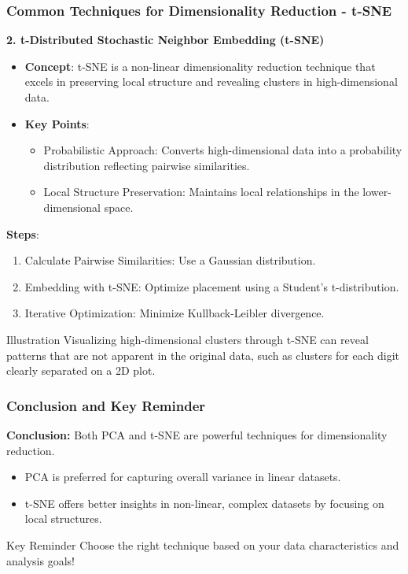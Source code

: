 \documentclass[aspectratio=169]{beamer}
\begin{document}
\begin{frame}[fragile]
    \frametitle{Common Techniques for Dimensionality Reduction - t-SNE}
    \textbf{2. t-Distributed Stochastic Neighbor Embedding (t-SNE)}
    
    \begin{itemize}
        \item \textbf{Concept}: t-SNE is a non-linear dimensionality reduction technique that excels in preserving local structure and revealing clusters in high-dimensional data.
        \item \textbf{Key Points}:
        \begin{itemize}
            \item Probabilistic Approach: Converts high-dimensional data into a probability distribution reflecting pairwise similarities.
            \item Local Structure Preservation: Maintains local relationships in the lower-dimensional space.
        \end{itemize}
    \end{itemize}
    
    \textbf{Steps}:
    \begin{enumerate}
        \item Calculate Pairwise Similarities: Use a Gaussian distribution.
        \item Embedding with t-SNE: Optimize placement using a Student's t-distribution.
        \item Iterative Optimization: Minimize Kullback-Leibler divergence.
    \end{enumerate}
    
    \begin{block}{Illustration}
        Visualizing high-dimensional clusters through t-SNE can reveal patterns that are not apparent in the original data, such as clusters for each digit clearly separated on a 2D plot.
    \end{block}
\end{frame}

\begin{frame}[fragile]
    \frametitle{Conclusion and Key Reminder}
    \textbf{Conclusion:} Both PCA and t-SNE are powerful techniques for dimensionality reduction.
    
    \begin{itemize}
        \item PCA is preferred for capturing overall variance in linear datasets.
        \item t-SNE offers better insights in non-linear, complex datasets by focusing on local structures.
    \end{itemize}
    
    \begin{block}{Key Reminder}
        Choose the right technique based on your data characteristics and analysis goals!
    \end{block}
\end{frame}
\end{document}
